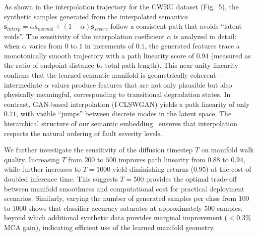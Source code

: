 As shown in the interpolation trajectory for the CWRU dataset (Fig.~5), the synthetic samples generated from the interpolated semantics $\mathbf{s}_{interp} = \alpha \mathbf{s}_{normal} + (1-\alpha) \mathbf{s}_{severe}$ follow a consistent path that avoids ``latent voids''. The sensitivity of the interpolation coefficient $\alpha$ is analyzed in detail: when $\alpha$ varies from $0$ to $1$ in increments of $0.1$, the generated features trace a monotonically smooth trajectory with a path linearity score of $0.94$ (measured as the ratio of endpoint distance to total path length). This near-unity linearity confirms that the learned semantic manifold is geometrically coherent---intermediate $\alpha$ values produce features that are not only plausible but also physically meaningful, corresponding to transitional degradation states. In contrast, GAN-based interpolation (f-CLSWGAN) yields a path linearity of only $0.71$, with visible ``jumps'' between discrete modes in the latent space. The hierarchical structure of our semantic embedding~\cite{liu2024hierarchical} ensures that interpolation respects the natural ordering of fault severity levels.

We further investigate the sensitivity of the diffusion timestep $T$ on manifold walk quality. Increasing $T$ from $200$ to $500$ improves path linearity from $0.88$ to $0.94$, while further increases to $T=1000$ yield diminishing returns ($0.95$) at the cost of doubled inference time. This suggests $T=500$ provides the optimal trade-off between manifold smoothness and computational cost for practical deployment scenarios. Similarly, varying the number of generated samples per class from $100$ to $1000$ shows that classifier accuracy saturates at approximately $500$ samples, beyond which additional synthetic data provides marginal improvement ($<0.3\%$ MCA gain), indicating efficient use of the learned manifold geometry.

